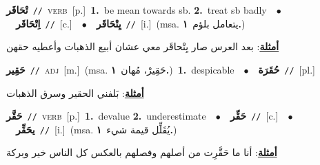 \documentclass[10pt,a4paper,twoside]{article} %
\begin{document}
\begin{multicols}{2}
{\setlength\topsep{0pt}\textbf{\foreignlanguage{arabic}{تْحَاقَر}}\ {\color{gray}\texttt{//}\color{black}}\ \textsc{verb}\ [p.]\ \textbf{1.}~be mean towards sb.  \textbf{2.}~treat sb badly\ \ $\bullet$\ \ \setlength\topsep{0pt}\textbf{\foreignlanguage{arabic}{اِتْحَاقَر}}\ {\color{gray}\texttt{//}\color{black}}\ [c.]\ \ $\bullet$\ \ \setlength\topsep{0pt}\textbf{\foreignlanguage{arabic}{يِتْحَاقَر}}\ {\color{gray}\texttt{//}\color{black}}\ [i.]\ \color{gray}(msa. \foreignlanguage{arabic}{يتعامل بلؤم}~\foreignlanguage{arabic}{\textbf{١.}})\color{black}\  \begin{flushright}\color{gray}\foreignlanguage{arabic}{\textbf{\underline{\foreignlanguage{arabic}{أمثلة}}}: بعد العرس صار يِتْحاقَر معي عشان أبيع الذهبات وأعطيه حقهن}\end{flushright}\color{black}} \vspace{2mm}

{\setlength\topsep{0pt}\textbf{\foreignlanguage{arabic}{حَقِير}}\ {\color{gray}\texttt{//}\color{black}}\ \textsc{adj}\ [m.]\ \color{gray}(msa. \foreignlanguage{arabic}{حَقِيرْ، مُهان}~\foreignlanguage{arabic}{\textbf{١.}})\color{black}\ \textbf{1.}~despicable\ \ $\bullet$\ \ \setlength\topsep{0pt}\textbf{\foreignlanguage{arabic}{حُقَرَة}}\ {\color{gray}\texttt{//}\color{black}}\ [pl.]\  \begin{flushright}\color{gray}\foreignlanguage{arabic}{\textbf{\underline{\foreignlanguage{arabic}{أمثلة}}}: بَلفني الحقير وسرق الذهبات}\end{flushright}\color{black}} \vspace{2mm}

{\setlength\topsep{0pt}\textbf{\foreignlanguage{arabic}{حَقَّر}}\ {\color{gray}\texttt{//}\color{black}}\ \textsc{verb}\ [p.]\ \textbf{1.}~devalue  \textbf{2.}~underestimate\ \ $\bullet$\ \ \setlength\topsep{0pt}\textbf{\foreignlanguage{arabic}{حَقِّر}}\ {\color{gray}\texttt{//}\color{black}}\ [c.]\ \ $\bullet$\ \ \setlength\topsep{0pt}\textbf{\foreignlanguage{arabic}{يحَقِّر}}\ {\color{gray}\texttt{//}\color{black}}\ [i.]\ \color{gray}(msa. \foreignlanguage{arabic}{يُقَلِّل قيمة شيء}~\foreignlanguage{arabic}{\textbf{١.}})\color{black}\  \begin{flushright}\color{gray}\foreignlanguage{arabic}{\textbf{\underline{\foreignlanguage{arabic}{أمثلة}}}: أنا ما حَقَّرِت من أصلهم وفصلهم بالعكس كل الناس خير وبركة}\end{flushright}\color{black}} \vspace{2mm}


\end{multicols}
\end{document}
